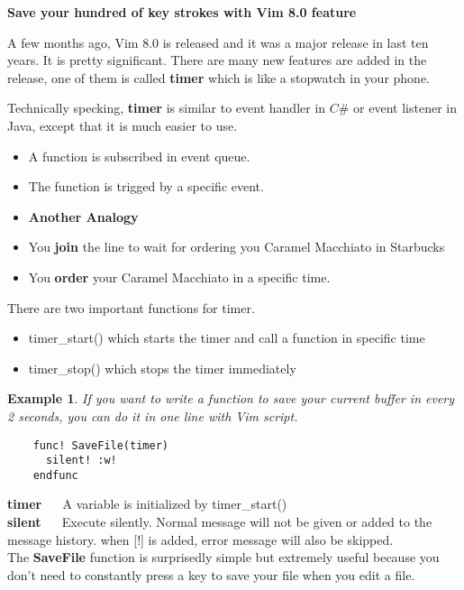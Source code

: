\documentclass{article}
\newtheorem{example}{Example}
\begin{document}
\vspace*{0.1cm}
\large
\begin{center}
\textbf{Save your hundred of key strokes with Vim 8.0 feature}
\end{center}
\vspace*{0.2cm}

A few months ago, Vim 8.0 is released and it was a major release in last ten years. It is pretty significant. There are many new features are added in the release, one of them is called \textbf{timer} which is like a stopwatch in your phone. 

Technically specking,
\textbf{timer} is similar to event handler in $C\#$ or event listener in Java, except that it is much easier to use. 
\begin{itemize}
 \item A function is subscribed in event queue. 
 \item The function is trigged by a specific event.  
 \item[] \textbf{Another Analogy}
 \item You \textbf{join} the line to wait for ordering you Caramel Macchiato in Starbucks
 \item You \textbf{order} your Caramel Macchiato in a specific time. 
\end{itemize}


There are two important functions for timer.
\begin{itemize}
\item timer{\_}start() which starts the timer and call a function in specific time
\item timer{\_}stop() which stops the timer immediately
\end{itemize}

\begin{example}
If you want to write a function to save your current buffer in every 2 seconds,
you can do it in one line with Vim script.  
\begin{verbatim}
    func! SaveFile(timer)
      silent! :w!
    endfunc
\end{verbatim} 
\end{example}
\textbf{timer} $\quad$ A variable is initialized by timer{\_}start() \\
\textbf{silent} $\quad$ Execute silently. Normal message will not be given or added to the message history. when [!] is added, error message will also be skipped. \\

The \textbf{SaveFile} function is surprisedly simple but extremely useful because you don't need to constantly press a key to save your file when you edit a file.
\end{document}
